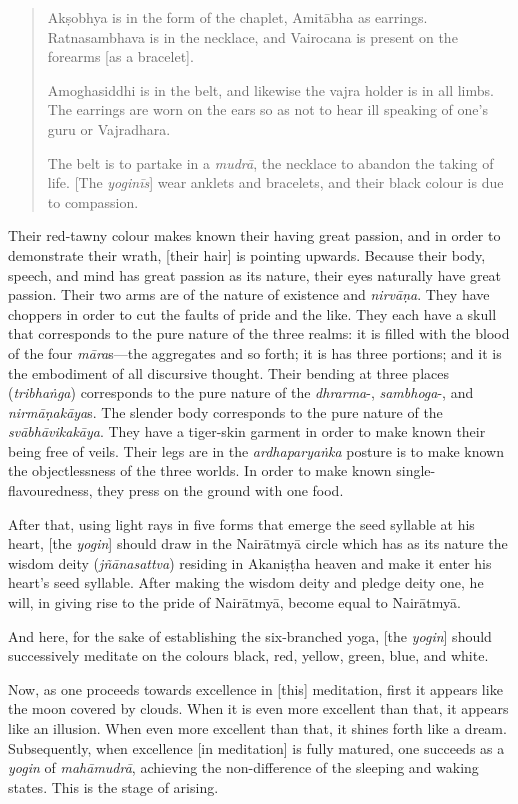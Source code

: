 \documentclass[naipra.tex]{subfiles}
\begin{document}
\begin{quote}
	Akṣobhya is in the form of the chaplet, Amitābha as earrings.
	Ratnasambhava is in the necklace, and Vairocana is present on the forearms [as a bracelet].
	
	Amoghasiddhi is in the belt, and likewise the vajra holder is in all limbs.
	The earrings are worn on the ears so as not to hear ill speaking of one's guru or Vajradhara.

	The belt is to partake in a \emph{mudrā}, the necklace to abandon the taking of life. 
	[The \emph{yoginīs}] wear anklets and bracelets, and their black colour is due to compassion.
\end{quote}

Their red-tawny colour makes known their having great passion, and in order to demonstrate their wrath, [their hair] is pointing upwards.
Because their body, speech, and mind has great passion as its nature, their eyes naturally have great passion.
Their two arms are of the nature of existence and \emph{nirvāṇa}.
They have choppers in order to cut the faults of pride and the like.
They each have a skull that corresponds to the pure nature of the three realms: it is filled with the blood of the four \emph{māra}s—the aggregates and so forth; it is has three portions; and it is the embodiment of all discursive thought.
Their bending at three places (\emph{tribhaṅga}) corresponds to the pure nature of the \emph{dhrarma}-, \emph{sambhoga}-, and \emph{nirmāṇakāya}s.
The slender body corresponds to the pure nature of the \emph{svābhāvikakāya}.
They have a tiger-skin garment in order to make known their being free of veils.
Their legs are \crux in the \emph{ardhaparyaṅka} posture \crux is to make known the objectlessness of the three worlds.
In order to make known single-flavouredness, they press on the ground with one food.

After that, using light rays in five forms that emerge the seed syllable at his heart, [the \emph{yogin}] should draw in the Nairātmyā circle which has as its nature the wisdom deity (\emph{jñānasattva}) residing in Akaniṣṭha heaven and make it enter his heart's seed syllable.
After making the wisdom deity and pledge deity one, he will, in giving rise to the pride of Nairātmyā, become equal to Nairātmyā.

And here, for the sake of establishing the six-branched yoga, [the \emph{yogin}] should successively meditate on the colours black, red, yellow, green, blue, and white.

Now, as one proceeds towards excellence in [this] meditation, first it appears like the moon covered by clouds.
When it is even more excellent than that, it appears like an illusion.
When even more excellent than that, it shines forth like a dream.
Subsequently, when excellence [in meditation] is fully matured, one succeeds as a \emph{yogin} of \emph{mahāmudrā}, achieving the non-difference of the sleeping and waking states.
This is the stage of arising.
\end{document}
